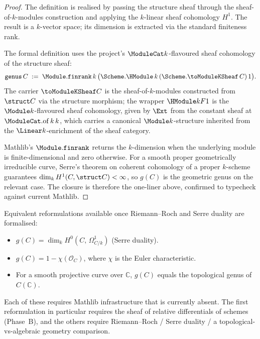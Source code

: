 \begin{proof}
  
  \leanok
  The definition is realised by passing the structure sheaf through the sheaf-of-\(k\)-modules construction and applying the \(k\)-linear sheaf cohomology \(H^1\). The result is a \(k\)-vector space; its dimension is extracted via the standard finiteness rank.

  \begin{remark}
    The formal definition uses the project's \(\ModuleCat k\)-flavoured sheaf cohomology of the structure sheaf:
    \[
      \mathtt{genus}\,C \;:=\; \Module.\mathtt{finrank}\,k\,\bigl(\Scheme.\HModule\,k\,(\Scheme.\toModuleKSheaf\,C)\,1\bigr).
    \]
    The carrier \(\toModuleKSheaf C\) is the sheaf-of-\(k\)-modules constructed from \(\struct C\) via the structure morphism; the wrapper \(\HModule k F 1\) is the \(\Module k\)-flavoured sheaf cohomology, given by \(\Ext\) from the constant sheaf at \(\ModuleCat.\mathrm{of}\,k\,k\), which carries a canonical \(\Module k\)-structure inherited from the \(\Linear k\)-enrichment of the sheaf category.
  \end{remark}

  Mathlib's \(\Module.\mathtt{finrank}\) returns the \(k\)-dimension when the underlying module is finite-dimensional and zero otherwise. For a smooth proper geometrically irreducible curve, Serre's theorem on coherent cohomology of a proper \(k\)-scheme guarantees \(\dim_k H^1(C, \struct C) < \infty\), so \(g(C)\) is the geometric genus on the relevant case. The closure is therefore the one-liner above, confirmed to typecheck against current Mathlib.
\end{proof}

Equivalent reformulations available once Riemann--Roch and Serre duality are formalised:
\begin{itemize}
  \item \(g(C) = \dim_k H^0(C,\, \Omega^1_{C/k})\) (Serre duality).
  \item \(g(C) = 1 - \chi(\mathcal O_C)\), where \(\chi\) is the Euler characteristic.
  \item For a smooth projective curve over \(\mathbb C\), \(g(C)\) equals the topological genus of \(C(\mathbb C)\).
\end{itemize}
Each of these requires Mathlib infrastructure that is currently absent. The first reformulation in particular requires the sheaf of relative differentials of schemes (Phase~B), and the others require Riemann--Roch / Serre duality / a topological-vs-algebraic geometry comparison.

